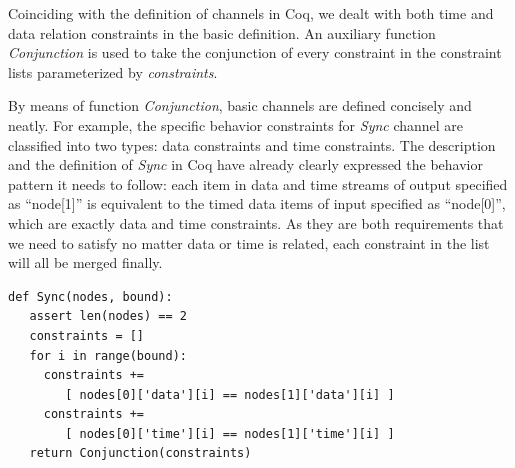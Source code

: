 \documentclass[3p,times]{elsarticle}
\begin{document}
Coinciding with the definition of channels in Coq, we dealt with both time and data relation constraints in the basic definition. An auxiliary function \emph{Conjunction} is used to take the conjunction of every constraint in the constraint lists parameterized by \emph{constraints}.

By means of function \emph{Conjunction}, basic channels are defined concisely and neatly. For example, the specific behavior constraints for \emph{Sync} channel are classified into two types: data constraints and time constraints. The description and the definition of \emph{Sync} in Coq have already clearly expressed the behavior pattern it needs to follow: each item in data and time streams of output specified as ``node[1]'' is equivalent to the timed data items of input specified as ``node[0]'', which are exactly data and time constraints. As they are both requirements that we need to satisfy no matter data or time is related, each constraint in the list will all be merged finally.
\begin{lstlisting}[frame=single]
def Sync(nodes, bound):
   assert len(nodes) == 2
   constraints = []
   for i in range(bound):
     constraints +=
        [ nodes[0]['data'][i] == nodes[1]['data'][i] ]
     constraints +=
        [ nodes[0]['time'][i] == nodes[1]['time'][i] ]
   return Conjunction(constraints)
\end{lstlisting}
\end{document}
